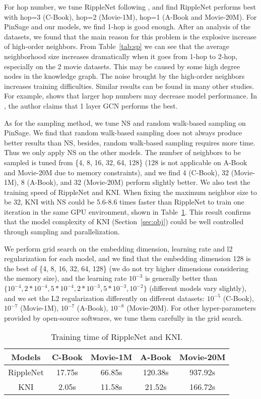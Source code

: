 \documentclass[sigconf]{acmart}
\begin{document}
For hop number, we tune RippleNet following \cite{wang2018ripplenet}, and find RippleNet performs best with hop=3 (C-Book), hop=2 (Movie-1M), hop=1 (A-Book and Movie-20M).
For PinSage and our models, we find 1-hop is good enough. 
After an analysis of the datasets, we found that the main reason for this problem is the explosive increase of high-order neighbors.
From Table~\ref{tab:sp} we can see that the average neighborhood size increases dramatically when it goes from 1-hop to 2-hop, especially on the 2 movie datasets.
This may be caused by some high degree nodes in the knowledge graph. 
The noise brought by the high-order neighbors increases training difficulties.
Similar results can be found in many other studies. For example,
\cite{wang2018ripplenet} shows that larger hop numbers may decrease model performance. 
In \cite{van2017graph}, the author claims that 1 layer GCN performs the best.


As for the sampling method, we tune NS and random walk-based sampling on PinSage.
We find that random walk-based sampling does not always produce better results than NS, besides, random walk-based sampling requires more time.
Thus we only apply NS on the other models.
The number of neighbors to be sampled is tuned from \{4, 8, 16, 32, 64, 128\} (128 is not applicable on A-Book and Movie-20M due to memory constraints), and we find 4 (C-Book), 32 (Movie-1M), 8 (A-Book), and 32 (Movie-20M) perform slightly better.
We also test the training speed of RippleNet and KNI. When fixing the maximum neighbor size to be 32, KNI with NS could be 5.6-8.6 times faster than RippleNet to train one iteration in the same GPU environment, shown in Table~\ref{tab:tr}. This result confirms that the model complexity of KNI (Section~\ref{sec:obj}) could be well controlled through sampling and parallelization.

We perform grid search on the embedding dimension, learning rate and l2 regularization for each model, and we find that the embedding dimension 128 is the best of \{4, 8, 16, 32, 64, 128\} (we do not try higher dimensions considering the memory size), and the learning rate $10^{-3}$ is generally better than $\{10^{-4}, 2*10^{-4}, 5*10^{-4}, 2*10^{-3}, 5*10^{-3}, 10^{-2}\}$ (different models vary slightly), and we set the L2 regularization differently on different datasets: $10^{-5}$ (C-Book), $10^{-7}$ (Movie-1M), $10^{-7}$ (A-Book), $10^{-8}$ (Movie-20M). For other hyper-parameters provided by open-source softwares, we tune them carefully in the grid search.

\begin{table}
    \centering
    \caption{Training time of RippleNet and KNI.}
    \label{tab:tr}
    \begin{tabular}{c|cccc} \hline
        Models & C-Book & Movie-1M & A-Book & Movie-20M \\ \hline \hline
        RippleNet & 17.75s & 66.85s & 120.38s & 937.92s \\
        KNI & 2.05s & 11.58s & 21.52s & 166.72s \\ \hline
    \end{tabular}
\end{table}
\end{document}
